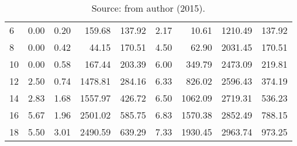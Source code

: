 \begin{table*}[h]
\begin{center}
\begin{tabular} {l | r r r r | r r r r }
6&   0.00 & 0.20 & 159.68 & 137.92 & 2.17 & 10.61 & 1210.49 & 137.92     \\
8&   0.00 & 0.42 & 44.15 & 170.51 & 4.50 & 62.90 & 2031.45 & 170.51      \\
10&  0.00 & 0.58 & 167.44 & 203.39 & 6.00 & 349.79 & 2473.09 & 219.81    \\
12&  2.50 & 0.74 & 1478.81 & 284.16 & 6.33 & 826.02 & 2596.43 & 374.19   \\
14&  2.83 & 1.68 & 1557.97 & 426.72 & 6.50 & 1062.09 & 2719.31 & 536.23  \\
16&  5.67 & 1.96 & 2501.02 & 585.75 & 6.83 & 1570.38 & 2852.49 & 788.15  \\
18&  5.50 & 3.01 & 2490.59 & 639.29 & 7.33 & 1930.45 & 2963.74 & 973.25  \\ 
\hline
\end{tabular}\caption*{Source: from author (2015).} 
\end{center}
\end{table*}


